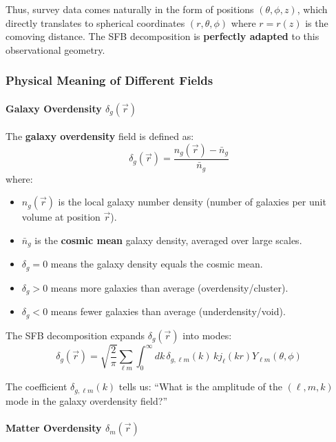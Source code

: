 Thus, survey data comes naturally in the form of positions $(\theta, \phi, z)$, which directly translates to spherical coordinates $(r, \theta, \phi)$ where $r = r(z)$ is the comoving distance. The SFB decomposition is \textbf{perfectly adapted} to this observational geometry.

\subsubsection{Physical Meaning of Different Fields}

\paragraph{Galaxy Overdensity $\delta_g(\vec{r})$}

The \textbf{galaxy overdensity} field is defined as:
\begin{equation}
\delta_g(\vec{r}) = \frac{n_g(\vec{r}) - \bar{n}_g}{\bar{n}_g}
\end{equation}
where:
\begin{itemize}
    \item $n_g(\vec{r})$ is the local galaxy number density (number of galaxies per unit volume at position $\vec{r}$).
    \item $\bar{n}_g$ is the \textbf{cosmic mean} galaxy density, averaged over large scales.
    \item $\delta_g = 0$ means the galaxy density equals the cosmic mean.
    \item $\delta_g > 0$ means more galaxies than average (overdensity/cluster).
    \item $\delta_g < 0$ means fewer galaxies than average (underdensity/void).
\end{itemize}

The SFB decomposition expands $\delta_g(\vec{r})$ into modes:
\begin{equation}
\delta_g(\vec{r}) = \sqrt{\frac{2}{\pi}} \sum_{\ell m} \int_0^\infty dk \, \delta_{g, \ell m}(k) \, k j_\ell(kr) Y_{\ell m}(\theta, \phi)
\end{equation}

The coefficient $\delta_{g, \ell m}(k)$ tells us: ``What is the amplitude of the $(\ell, m, k)$ mode in the galaxy overdensity field?''

\paragraph{Matter Overdensity $\delta_m(\vec{r})$}


